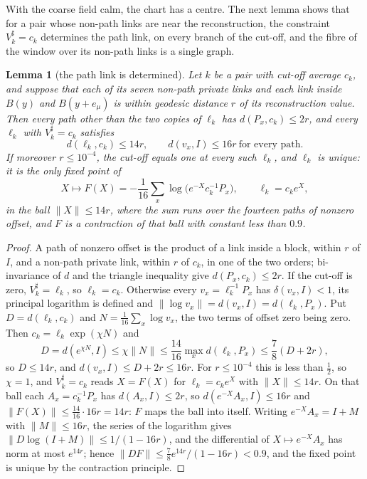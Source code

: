 \documentclass[11pt]{amsart}
\newtheorem{lemma}[theorem]{Lemma}
\theoremstyle{definition}
\theoremstyle{remark}
\numberwithin{equation}{section}
\begin{document}
With the coarse field calm, the chart has a centre. The next lemma shows
that for a pair whose non-path links are near the reconstruction, the
constraint $V^\sharp_k=c_k$ determines the path link, on every branch of
the cut-off, and the fibre of the window over its non-path links is a
single graph.

\begin{lemma}[the path link is determined]\label{lem:branchbound}
Let $k$ be a pair with cut-off average $c_k$, and suppose that each of its
seven non-path private links and each link inside $B(y)$ and
$B(y+e_\mu)$ is within geodesic distance $r$ of its reconstruction value.
Then every path other than the two copies of $\ell_k$ has $d(P_x,c_k)\le
2r$, and every $\ell_k$ with $V^\sharp_k=c_k$ satisfies
\[
d(\ell_k,c_k)\le14r ,\qquad d(v_x,I)\le16r\ \text{for every path}.
\]
If moreover $r\le10^{-4}$, the cut-off equals one at every such $\ell_k$,
and $\ell_k$ is unique: it is the only fixed point of
\[
X\mapsto F(X)=-\frac1{16}\sum_{x}\log\bigl(e^{-X}c_k^{-1}P_x\bigr),
\qquad \ell_k=c_ke^X ,
\]
in the ball $\lVert X\rVert\le14r$, where the sum runs over the fourteen
paths of nonzero offset, and $F$ is a contraction of that ball with
constant less than $0.9$.
\end{lemma}

\begin{proof}
A path of nonzero offset is the product of a link inside a block, within
$r$ of $I$, and a non-path private link, within $r$ of $c_k$, in one of
the two orders; bi-invariance of $d$ and the triangle inequality give
$d(P_x,c_k)\le2r$. If the cut-off is zero, $V^\sharp_k=\ell_k$, so $\ell_k=
c_k$. Otherwise every $v_x=\ell_k^{-1}P_x$ has $\delta(v_x,I)<1$, its
principal logarithm is defined and $\lVert\log v_x\rVert=d(v_x,I)=d(\ell_k,
P_x)$. Put $D=d(\ell_k,c_k)$ and $N=\frac1{16}\sum_x\log v_x$, the two
terms of offset zero being zero. Then $c_k=\ell_k\exp(\chi N)$ and
\[
D=d(e^{\chi N},I)\le\chi\lVert N\rVert\le\frac{14}{16}\max_xd(\ell_k,P_x)
\le\frac78(D+2r),
\]
so $D\le14r$, and $d(v_x,I)\le D+2r\le16r$. For $r\le10^{-4}$ this is less
than $\frac12$, so $\chi=1$, and $V^\sharp_k=c_k$ reads $X=F(X)$ for
$\ell_k=c_ke^X$ with $\lVert X\rVert\le14r$. On that ball each $A_x=c_k^{-1}P_x$ has $d(A_x,I)\le2r$, so
$d(e^{-X}A_x,I)\le16r$ and $\lVert F(X)\rVert\le\frac{14}{16}\cdot16r=14r$:
$F$ maps the ball into itself. Writing $e^{-X}A_x=I+M$ with $\lVert M\rVert
\le16r$, the series of the logarithm gives $\lVert D\log(I+M)\rVert\le
1/(1-16r)$, and the differential of $X\mapsto e^{-X}A_x$ has norm at most
$e^{14r}$; hence $\lVert DF\rVert\le\frac78e^{14r}/(1-16r)<0.9$, and the
fixed point is unique by the contraction principle.
\end{proof}
\end{document}
